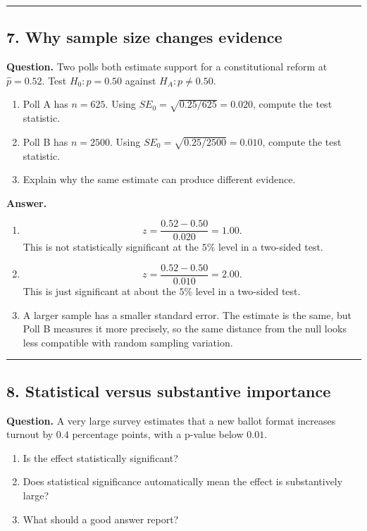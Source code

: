 \documentclass[12pt]{article}
\begin{document}
\hrule

\subsection*{7. Why sample size changes evidence}

\noindent
\textbf{Question.}
Two polls both estimate support for a constitutional reform at $\hat{p}=0.52$. Test $H_0:p=0.50$ against $H_A:p\ne 0.50$.

\begin{enumerate}[label=(\alph*)]
\item Poll A has $n=625$. Using $SE_0=\sqrt{0.25/625}=0.020$, compute the test statistic.
\item Poll B has $n=2500$. Using $SE_0=\sqrt{0.25/2500}=0.010$, compute the test statistic.
\item Explain why the same estimate can produce different evidence.
\end{enumerate}

\noindent
\textbf{Answer.}
\begin{enumerate}[label=(\alph*)]
\item
\[
z=\frac{0.52-0.50}{0.020}=1.00.
\]
This is not statistically significant at the $5\%$ level in a two-sided test.
\item
\[
z=\frac{0.52-0.50}{0.010}=2.00.
\]
This is just significant at about the $5\%$ level in a two-sided test.
\item A larger sample has a smaller standard error. The estimate is the same, but Poll B measures it more precisely, so the same distance from the null looks less compatible with random sampling variation.
\end{enumerate}

\hrule

\subsection*{8. Statistical versus substantive importance}

\noindent
\textbf{Question.}
A very large survey estimates that a new ballot format increases turnout by $0.4$ percentage points, with a p-value below $0.01$.

\begin{enumerate}[label=(\alph*)]
\item Is the effect statistically significant?
\item Does statistical significance automatically mean the effect is substantively large?
\item What should a good answer report?
\end{enumerate}
\end{document}
